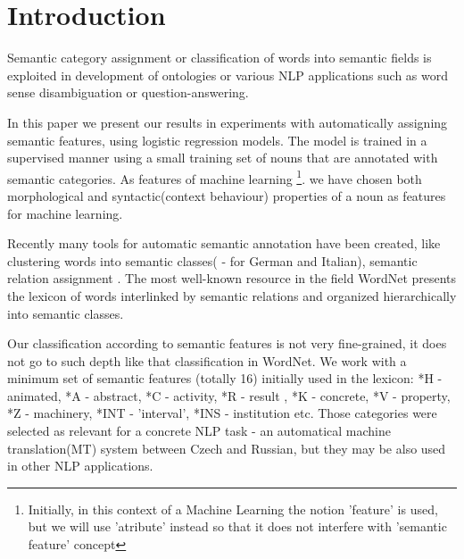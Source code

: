 \documentclass[letterpaper]{article}
\begin{document}
%
\title{}
\maketitle
\begin{abstract}
\begin{quote}
\end{quote}
\end{abstract}


\section{Introduction}

Semantic category assignment or classification of words into semantic fields
is exploited in development of ontologies or various NLP applications such as
word sense disambiguation or question-answering.

In this paper we present our results in experiments with automatically assigning semantic features,
using logistic regression models. The model is trained in a supervised manner
using a small training set of nouns that are annotated with semantic categories.
As features of machine learning \footnote{Initially, in this context of a Machine Learning the notion 'feature'
is used, but we will use 'atribute' instead so that it does not interfere with 'semantic feature' concept}.
we have chosen both morphological and syntactic(context behaviour) properties 
of a noun as features for machine learning.

Recently many tools for automatic semantic annotation have been created, like
clustering words into semantic classes(\cite{baroni:2009} - for German and Italian), 
semantic relation assignment \cite{peirsman}. The most well-known resource
in the field WordNet \cite{wordnet} presents the lexicon of words
interlinked by semantic relations and organized hierarchically into 
semantic classes.

Our classification according to semantic features is not very fine-grained,
it does not go to such depth like that classification
in WordNet. We work with a minimum set of semantic features (totally 16)
 initially used in the lexicon:
*H - animated, *A - abstract, *C - activity, *R - result , 
*K - concrete, *V - property, *Z - machinery, *INT - 'interval',
 *INS - institution etc. Those categories were selected as 
relevant for a concrete NLP task - an automatical machine translation(MT)
system between Czech and Russian, but they may be also used in other
NLP applications.  
\end{document}
